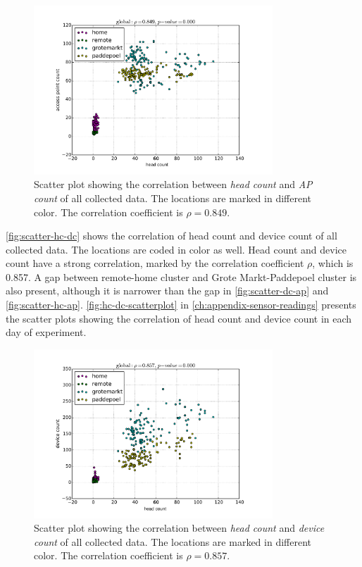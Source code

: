 	\begin{figure}[h]
		\centering
		\includegraphics[width=0.8\textwidth]{./img/result/global-gt-vs-ap}
		\caption[Scatter plot showing the correlation of head count and \ac{AP} count.]
		{Scatter plot showing the correlation between \textit{head count} and \textit{\ac{AP} count} of all collected data. The locations are marked in different color. The correlation coefficient is $\rho=0.849$.}
		\label{fig:scatter-hc-ap}
	\end{figure}

	\autoref{fig:scatter-hc-dc} shows the correlation of head count and device count of all collected data. The locations are coded in color as well. Head count and device count have a strong correlation, marked by the correlation coefficient $\rho$, which is 0.857. A gap between remote-home cluster and Grote Markt-Paddepoel cluster is also present, although it is narrower than the gap in \autoref{fig:scatter-dc-ap} and \autoref{fig:scatter-hc-ap}. \autoref{fig:hc-dc-scatterplot} in \autoref{ch:appendix-sensor-readings} presents the scatter plots showing the correlation of head count and device count in each day of experiment.

	\begin{figure}[H]
		\centering
		\includegraphics[width=0.8\textwidth]{./img/result/global-gt-vs-pr}
		\caption[Scatter plot showing the correlation of head count and device count.]
		{Scatter plot showing the correlation between \textit{head count} and \textit{device count} of all collected data. The locations are marked in different color. The correlation coefficient is $\rho=0.857$.}
		\label{fig:scatter-hc-dc}
	\end{figure}


